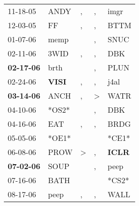 \begin{supertabular}{p{0.07\textwidth}p{0.06\textwidth}p{0.02\textwidth}p{0.02\textwidth}p{0.06\textwidth}}
          11-18-05\textsuperscript{} &           ANDY\textsuperscript{} &                , &                , &           imgr\textsuperscript{} \\
          12-03-05\textsuperscript{} &             FF\textsuperscript{} &                , &                , &           BTTM\textsuperscript{} \\
          01-07-06\textsuperscript{} &           memp\textsuperscript{} &                  &                , &           SNUC\textsuperscript{} \\
          02-11-06\textsuperscript{} &           3WID\textsuperscript{} &                , &                , &            DBK\textsuperscript{} \\
 \textbf{02-17-06\textsuperscript{}} &           brth\textsuperscript{} &                  &                , &           PLUN\textsuperscript{} \\
          02-24-06\textsuperscript{} &  \textbf{VISI\textsuperscript{}} &                , &                , &           j4al\textsuperscript{} \\
 \textbf{03-14-06\textsuperscript{}} &           ANCH\textsuperscript{} &                , &     \textgreater &           WATR\textsuperscript{} \\
          04-10-06\textsuperscript{} &                            *OS2* &                  &                , &            DBK\textsuperscript{} \\
          04-16-06\textsuperscript{} &            EAT\textsuperscript{} &                , &                , &           BRDG\textsuperscript{} \\
          05-05-06\textsuperscript{} &                            *OE1* &                  &                  &                            *CE1* \\
          06-08-06\textsuperscript{} &           PROW\textsuperscript{} &     \textgreater &                , &  \textbf{ICLR\textsuperscript{}} \\
 \textbf{07-02-06\textsuperscript{}} &           SOUP\textsuperscript{} &                  &                , &           peep\textsuperscript{} \\
          07-16-06\textsuperscript{} &           BATH\textsuperscript{} &                  &                  &                            *CS2* \\
          08-17-06\textsuperscript{} &           peep\textsuperscript{} &                , &                , &           WALL\textsuperscript{} \\

\end{supertabular}
